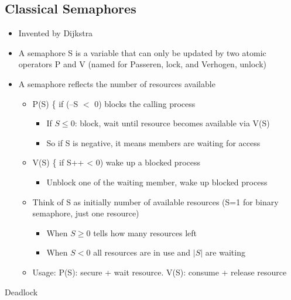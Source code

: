 \subsection{Classical Semaphores}
\begin{itemize}
    \item Invented by Dijkstra
    \item A semaphore S is a variable that can only be updated by two atomic operators P and V (named for Passeren, lock, and Verhogen, unlock)
    \item A semaphore reflects the number of resources available
    \begin{itemize}
        \item P(S) \{ if (--S $<$ 0) blocks the calling process
        \begin{itemize}
            \item If $S\leq 0$: block, wait until resource becomes available via V(S)
            \item So if S is negative, it means members are waiting for access
        \end{itemize}
        \item V(S) \{ if S++ < 0) wake up a blocked process
        \begin{itemize}
            \item Unblock one of the waiting member, wake up blocked process
        \end{itemize}
        \item Think of S as initially number of available resources (S=1 for binary semaphore, just one resource)
        \begin{itemize}
            \item When $S\geq 0$ tells how many resources left
            \item When $S < 0$ all resources are in use and $|S|$ are waiting
        \end{itemize}
        \item Usage: P(S): secure + wait resource. V(S): consume + release resource
    \end{itemize}
\end{itemize}
Deadlock
